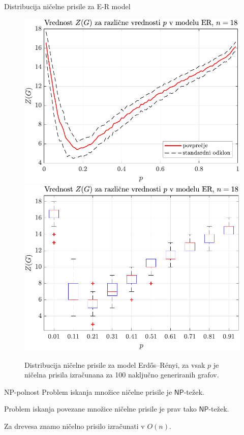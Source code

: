 \documentclass{beamer}
\newcommand{\NP}{\ensuremath{\mathsf{NP}}}
\begin{document}
\begin{frame}{Distribucija ničelne prisile za E-R model}
    \begin{figure}
        \centering
        \includegraphics[width=0.49\linewidth]{../koda/results/plots/er_zfn_dist_18_avg.pdf}
        \includegraphics[width=0.49\linewidth]{../koda/results/plots/er_zfn_dist_18_boxplot.pdf}
        \caption{Distribucija ničelne prisile za model Erdős–Rényi, za vsak $p$ je ničelna prisila izračunana za 100 naključno generiranih grafov.}
    \end{figure}
\end{frame}

\begin{frame}{\textsf{NP}-polnost}
    Problem iskanja množice ničelne prisile je $\NP$-težek. 
    
    \bigskip
    
    Problem iskanja povezane množice ničelne prisile je prav tako $\NP$-težek.
    
    \bigskip
    
    Za drevesa znamo ničelno prisilo izračunati v $O(n)$.
\end{frame}
\end{document}

